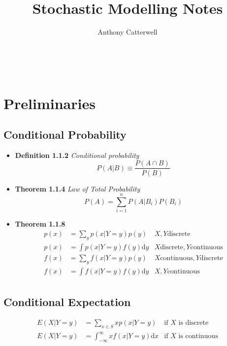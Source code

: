 \documentclass[11pt,a4paper]{article}
\title{Stochastic Modelling Notes}
\author{Anthony Catterwell}
\begin{document}
\maketitle
\tableofcontents

\break\

\section{Preliminaries}

\subsection{Conditional Probability}

\begin{itemize}

    \item \textbf{Definition 1.1.2} \emph{Conditional probability}
        \[
            P(A|B) \equiv \frac{P(A \cap B)}{P(B)}
        \]

    \item \textbf{Theorem 1.1.4} \emph{Law of Total Probability}
        \[
            P(A) = \sum_{i=1}^n P(A|B_i)P(B_i)
        \]

    \item \textbf{Theorem 1.1.8}
        \begin{align*}{}
            p(x) &= \sum_y p(x|Y=y)p(y)            & X, Y \text{discrete} \\
            p(x) &= \int   p(x|Y=y)f(y)\mathrm{d}y & X \text{discrete}, Y \text{continuous} \\
            f(x) &= \sum_y f(x|Y=y)p(y)            & X\text{continuous}, Y \text{discrete} \\
            f(x) &= \int   f(x|Y=y)f(y)\mathrm{d}y & X, Y \text{continuous} \\
        \end{align*}

\end{itemize}

\subsection{Conditional Expectation}

\begin{align*}{}
    E(X|Y = y) &= \sum_{x \in S} xp(x|Y=y) &\text{if $X$ is discrete} \\
    E(X|Y = y) &= \int_{-\infty}^{\infty} xf(x|Y=y)\mathrm{d}x &\text{if $X$ is continuous}
\end{align*}
\end{document}
